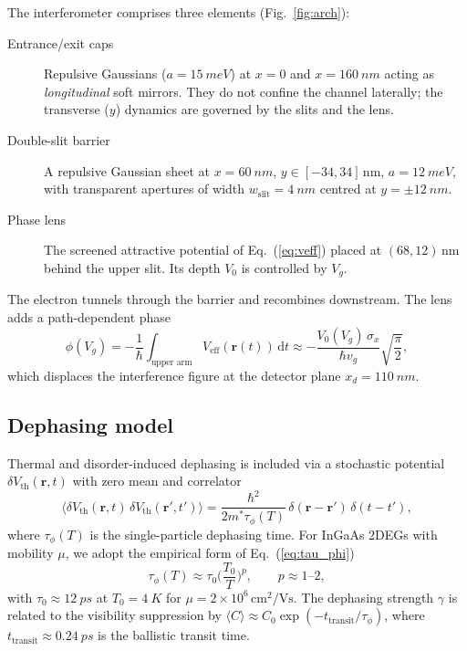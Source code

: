 \documentclass[11pt,a4paper]{article}
\newcommand{\expt}[1]{\langle#1\rangle}
\newcommand{\dd}{\mathrm{d}}
\begin{document}
The interferometer comprises three elements (Fig.~\ref{fig:arch}):
\begin{description}
\item[Entrance/exit caps] Repulsive Gaussians ($a=\SI{15}{meV}$) at $x=0$ and 
$x=\SI{160}{nm}$ acting as \emph{longitudinal} soft mirrors. They do not 
confine the channel laterally; the transverse ($y$) dynamics are governed by 
the slits and the lens.
\item[Double-slit barrier] A repulsive Gaussian sheet at $x=\SI{60}{nm}$, 
$y\in[-34,34]\,$nm, $a=\SI{12}{meV}$, with transparent apertures of width 
$w_{\text{slit}}=\SI{4}{nm}$ centred at $y=\pm\SI{12}{nm}$.
\item[Phase lens] The screened attractive potential of Eq.~(\ref{eq:veff}) 
placed at $(68,12)\,$nm behind the upper slit. Its depth $V_0$ is controlled 
by $V_g$.
\end{description}

The electron tunnels through the barrier and recombines downstream. The lens 
adds a path-dependent phase
\begin{equation}
\phi(V_g) = -\frac{1}{\hbar}\int_{\text{upper arm}} V_{\text{eff}}(\mathbf{r}(t))\,\dd t
\approx -\frac{V_0(V_g)\,\sigma_x}{\hbar v_g}\sqrt{\frac{\pi}{2}},
\label{eq:phase}
\end{equation}
which displaces the interference figure at the detector plane 
$x_d=\SI{110}{nm}$.

\subsection{Dephasing model}
\label{sec:dephasing}

Thermal and disorder-induced dephasing is included via a stochastic potential 
$\delta V_{\text{th}}(\mathbf{r},t)$ with zero mean and correlator~\cite{bylander2011}
\begin{equation}
\expt{\delta V_{\text{th}}(\mathbf{r},t)\,\delta V_{\text{th}}(\mathbf{r}',t')}
= \frac{\hbar^2}{2m^*\tau_\phi(T)}\,\delta(\mathbf{r}-\mathbf{r}')\,\delta(t-t'),
\label{eq:dephasing}
\end{equation}
where $\tau_\phi(T)$ is the single-particle dephasing time. For InGaAs 2DEGs 
with mobility $\mu$, we adopt the empirical form of
Eq.~(\ref{eq:tau_phi})~\cite{roulleau2008}
\begin{equation}
\tau_\phi(T) \approx \tau_0\Big(\frac{T_0}{T}\Big)^p,
\qquad p\approx 1\text{--}2,
\label{eq:tau_phi}
\end{equation}
with $\tau_0\approx\SI{12}{ps}$ at $T_0=\SI{4}{K}$ for 
$\mu=2\times10^6\,\text{cm}^2\text{/Vs}$. The dephasing strength $\gamma$ is 
related to the visibility suppression by 
$\expt{C}\approx C_0\exp(-t_{\text{transit}}/\tau_\phi)$, where 
$t_{\text{transit}}\approx\SI{0.24}{ps}$ is the ballistic transit time.
\end{document}
